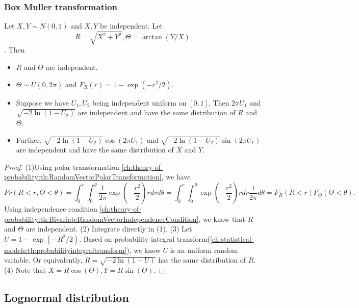 \begin{refsection}
\subsubsection{Box Muller transformation}

\begin{lemma}\label{ch:theory-of-statistics:th:BoxMullerTransformation}
Let $X,Y\sim N(0,1)$ and $X,Y$ be independent. Let $$R=\sqrt{X^2+Y^2}, \Theta = \arctan(Y/X)$$. Then 
\begin{itemize}
	\item $R$ and $\Theta$ are independent.
	\item $\Theta \sim U(0,2\pi)$ and $F_R(r) = 1 - \exp(-r^2/2)$.
	\item Suppose we have $U_1,U_2$ being independent uniform on $[0,1]$. Then
	$2\pi U_1$ and $\sqrt{-2\ln(1-U_2)}$ are independent and have the same distribution of $R$ and $\Theta$.
	\item Further, $\sqrt{-2\ln(1-U_2)}\cos(2\pi U_1)$ and $\sqrt{-2\ln(1-U_2)}\sin(2\pi U_1)$ are independent and have the same distribution of $X$ and $Y$. 
\end{itemize}	
\end{lemma}
\begin{proof}
(1)Using polar transformation \autoref{ch:theory-of-probability:th:RandomVectorPolarTransformation}, we have
$$Pr(R<r,\Theta < \theta) = \int_0^r\int_0^{\theta} \frac{1}{2\pi} \exp(-\frac{r^2}{2})r drd\theta = \int_0^r\int_0^{\theta}  \exp(-\frac{r^2}{2})r dr \frac{1}{2\pi}d\theta = F_R(R<r)F_{\Theta}(\Theta<\theta).$$	
Using independence condition  \autoref{ch:theory-of-probability:th:BivariateRandomVectorIndependenceCondition}, we know that $R$ and $\Theta$ are independent.
(2) Integrate directly in (1). (3) Let $U=1 - \exp(-R^2/2)$.
Based on probability integral transform(\autoref{ch:statistical-models:th:probabilityintegraltransform}), we know $U$ is an uniform random variable. Or equivalently, $R = \sqrt{-2\ln(1-U)}$ has the same distribution of $R$.
(4) Note that $X = R\cos(\Theta),Y=R\sin(\Theta)$.
\end{proof}

\subsection{Lognormal distribution}

\end{refsection}
